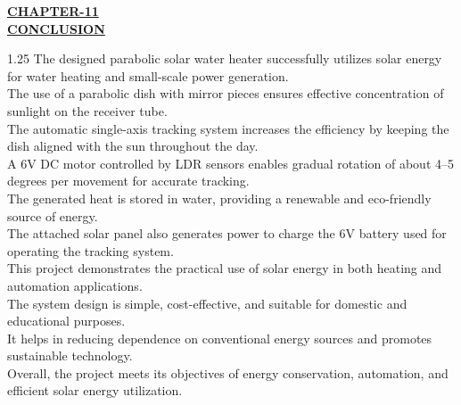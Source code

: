 \begin{center}
  {\fontsize{15}{18}\selectfont \bfseries \textcolor{red!80!black}{\underline{CHAPTER-11}}}\\[2mm]
  {\fontsize{16}{20}\selectfont \bfseries \textcolor{red!80!black}{\underline{CONCLUSION}}}\\[6mm]
\end{center}

\noindent
\begin{spacing}{1.25}
{\fontsize{10.2}{15}\selectfont
The designed parabolic solar water heater successfully utilizes solar energy for water heating and small-scale power generation.\\[3mm]
The use of a parabolic dish with mirror pieces ensures effective concentration of sunlight on the receiver tube.\\[3mm]
The automatic single-axis tracking system increases the efficiency by keeping the dish aligned with the sun throughout the day.\\[3mm]
A 6V DC motor controlled by LDR sensors enables gradual rotation of about 4--5 degrees per movement for accurate tracking.\\[3mm]
The generated heat is stored in water, providing a renewable and eco-friendly source of energy.\\[3mm]
The attached solar panel also generates power to charge the 6V battery used for operating the tracking system.\\[3mm]
This project demonstrates the practical use of solar energy in both heating and automation applications.\\[3mm]
The system design is simple, cost-effective, and suitable for domestic and educational purposes.\\[3mm]
It helps in reducing dependence on conventional energy sources and promotes sustainable technology.\\[3mm]
Overall, the project meets its objectives of energy conservation, automation, and efficient solar energy utilization.
}
\end{spacing}
\clearpage
